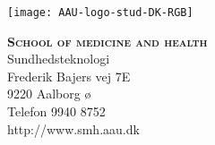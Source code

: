 




\begin{minipage}[t]{0.48\textwidth}
\vspace*{-25pt}			%
\texttt{[image: AAU-logo-stud-DK-RGB]}
\end{minipage}
\hfill
\begin{minipage}[t]{0.48\textwidth}
{\small 
\noindent  \textsc{\textbf{School of medicine and health}}\\
Sundhedsteknologi \\
Frederik Bajers vej 7E \\
9220 Aalborg ø\\
Telefon 9940 8752 \\
http://www.smh.aau.dk}
\end{minipage}

\vspace*{0.5cm}


